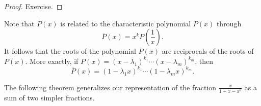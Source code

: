 
\begin{proof}
Exercise.
\end{proof}

Note that $\overline{P}(x)$ is related to the characteristic polynomial $P(x)$ through
\[
\overline{P}(x) = x^k P\left(\frac1x\right).
\]
It follows that the roots of the polynomial $\overline{P}(x)$ are reciprocals of the roots of $P(x)$.
More exactly, if $P(x) = (x - \lambda_1)^{k_1} \cdots (x - \lambda_m)^{k_m}$, then
\[
\overline{P}(x) = (1 - \lambda_1 x)^{k_1} \cdots (1- \lambda_m x)^{k_m}.
\]

The following theorem generalizes our representation of the fraction $\frac{x}{1-x-x^2}$ as a sum of two simpler fractions.